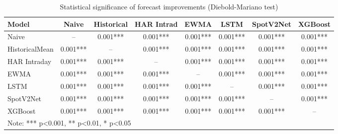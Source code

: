 \documentclass[journal]{IEEEtran}
\begin{document}
\begin{table}[!t]
\centering
\caption{Statistical significance of forecast improvements (Diebold-Mariano test)}
\label{tab:statistical_tests}
\begin{tabular}{lccccccc}
\toprule
Model & Naive & Historical & HAR Intrad & EWMA & LSTM & SpotV2Net & XGBoost \\
\midrule
Naive & -- & 0.001*** & 0.001*** & 0.001*** & 0.001*** & 0.001*** & 0.001*** \\
HistoricalMean & 0.001*** & -- & 0.001*** & 0.001*** & 0.001*** & 0.001*** & 0.001*** \\
HAR Intraday & 0.001*** & 0.001*** & -- & 0.001*** & 0.001*** & 0.001*** & 0.001*** \\
EWMA & 0.001*** & 0.001*** & 0.001*** & -- & 0.001*** & 0.001*** & 0.001*** \\
LSTM & 0.001*** & 0.001*** & 0.001*** & 0.001*** & -- & 0.001*** & 0.001*** \\
SpotV2Net & 0.001*** & 0.001*** & 0.001*** & 0.001*** & 0.001*** & -- & 0.001*** \\
XGBoost & 0.001*** & 0.001*** & 0.001*** & 0.001*** & 0.001*** & 0.001*** & -- \\
\bottomrule
\multicolumn{8}{l}{\footnotesize Note: *** p<0.001, ** p<0.01, * p<0.05}
\end{tabular}
\end{table}
\end{document}
